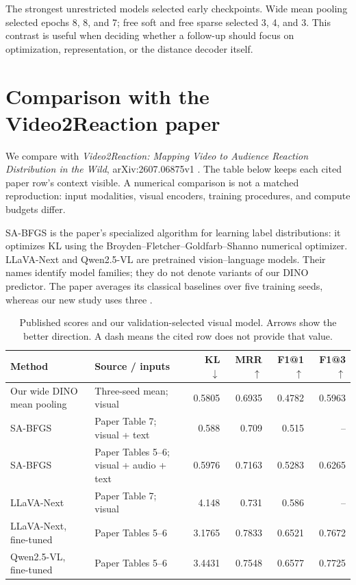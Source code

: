 \documentclass[11pt,a4paper]{article}
\begin{document}
The strongest unrestricted models selected early checkpoints. Wide mean pooling selected epochs 8, 8, and 7; free soft and free sparse selected 3, 4, and 3. This contrast is useful when deciding whether a follow-up should focus on optimization, representation, or the distance decoder itself.

\clearpage
\section{Comparison with the Video2Reaction paper}\label{sec:paper}
We compare with \emph{Video2Reaction: Mapping Video to Audience Reaction Distribution in the Wild}, arXiv:2607.06875v1 \cite{paper}. The table below keeps each cited paper row's context visible. A numerical comparison is not a matched reproduction: input modalities, visual encoders, training procedures, and compute budgets differ.

SA-BFGS is the paper's specialized algorithm for learning label distributions: it optimizes KL using the Broyden--Fletcher--Goldfarb--Shanno numerical optimizer. LLaVA-Next and Qwen2.5-VL are pretrained vision--language models. Their names identify model families; they do not denote variants of our DINO predictor. The paper averages its classical baselines over five training seeds, whereas our new study uses three \cite{paper}.

\begin{table}[htbp]\centering\small
\caption{Published scores and our validation-selected visual model. Arrows show the better direction. A dash means the cited row does not provide that value.}
\begin{tabularx}{\linewidth}{p{4.1cm}Xrrrr}\toprule
Method & Source / inputs & KL $\downarrow$ & MRR $\uparrow$ & F1@1 $\uparrow$ & F1@3 $\uparrow$\\\midrule
Our wide DINO mean pooling & Three-seed mean; visual & 0.5805 & 0.6935 & 0.4782 & 0.5963\\
SA-BFGS & Paper Table 7; visual + text & 0.588 & 0.709 & 0.515 & --\\
SA-BFGS & Paper Tables 5--6; visual + audio + text & 0.5976 & 0.7163 & 0.5283 & 0.6265\\
LLaVA-Next & Paper Table 7; visual & 4.148 & 0.731 & 0.586 & --\\
LLaVA-Next, fine-tuned & Paper Tables 5--6 & 3.1765 & 0.7833 & 0.6521 & 0.7672\\
Qwen2.5-VL, fine-tuned & Paper Tables 5--6 & 3.4431 & 0.7548 & 0.6577 & 0.7725\\\bottomrule
\end{tabularx}\end{table}
\end{document}
